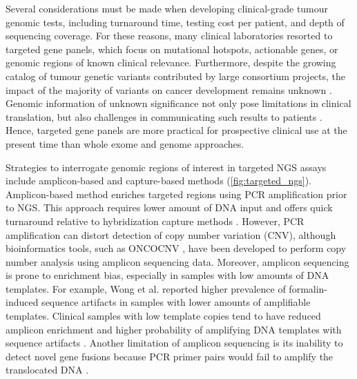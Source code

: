 Several considerations must be made when developing clinical-grade tumour genomic tests, including turnaround time, testing cost per patient, and depth of sequencing coverage. For these reasons, many clinical laboratories resorted to targeted gene panels, which focus on mutational hotspots, actionable genes, or genomic regions of known clinical relevance. Furthermore, despite the growing catalog of tumour genetic variants contributed by large consortium projects, the impact of the majority of variants on cancer development remains unknown \cite{Sukhai2016, Strom2016, Richards2015}. Genomic information of unknown significance not only pose limitations in clinical translation, but also challenges in communicating such results to patients \cite{Culver2013, Strom2016, Richards2015, Scherr2015}. Hence, targeted gene panels are more practical for prospective clinical use at the present time than whole exome and genome approaches.

Strategies to interrogate genomic regions of interest in targeted NGS assays include amplicon-based and capture-based methods (\autoref{fig:targeted_ngs}). Amplicon-based method enriches targeted regions using PCR amplification prior to NGS. This approach requires lower amount of DNA input and offers quick turnaround relative to hybridization capture methods \cite{Chang2013, Gagan2015}. However, \acs{PCR} amplification can distort detection of copy number variation (\acs{CNV}), although bioinformatics tools, such as ONCOCNV \cite{Boeva2014}, have been developed to perform copy number analysis using amplicon sequencing data. Moreover, amplicon sequencing is prone to enrichment bias, especially in samples with low amounts of DNA templates. For example, Wong et al. \cite{Wong2014} reported higher prevalence of formalin-induced sequence artifacts in samples with lower amounts of amplifiable templates. Clinical samples with low template copies tend to have reduced amplicon enrichment and higher probability of amplifying DNA templates with sequence artifacts \cite{Wong2014}. Another limitation of amplicon sequencing is its inability to detect novel gene fusions because PCR primer pairs would fail to amplify the translocated DNA \cite{Simon2013, Gagan2015}.


